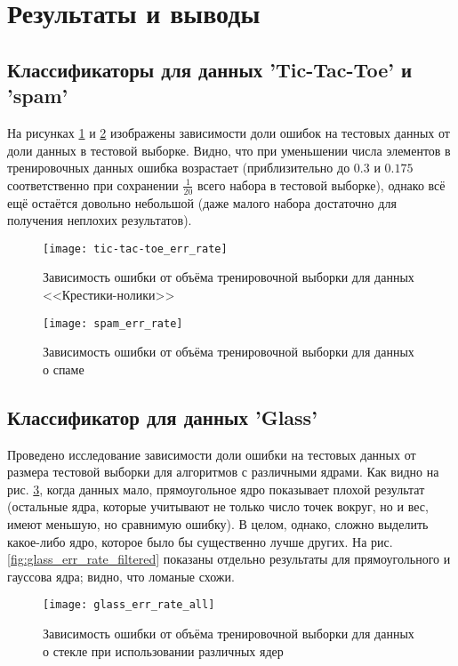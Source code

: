 \documentclass[a4paper,12pt]{article} %
\newcommand{\myPictWidth}{.95\textwidth}
\begin{document}
\newpage
\section{Результаты и выводы}

\subsection{Классификаторы для данных 'Tic-Tac-Toe' и 'spam'}

На рисунках \ref{fig:ttoe} и \ref{fig:spam} изображены зависимости доли ошибок на тестовых данных от доли данных в тестовой выборке. Видно, что при уменьшении числа элементов в тренировочных данных ошибка возрастает (приблизительно до $0.3$ и $0.175$ соответственно при сохранении $\frac{1}{20}$ всего набора в тестовой выборке), однако всё ещё остаётся довольно небольшой (даже малого набора достаточно для получения неплохих результатов).

\begin{figure}[H]
    \centering \texttt{[image: tic-tac-toe\_err\_rate]}
    \caption{Зависимость ошибки от объёма тренировочной выборки для данных <<Крестики-нолики>>}
    \label{fig:ttoe}
\end{figure}

\begin{figure}[H]
    \centering \texttt{[image: spam\_err\_rate]}
    \caption{Зависимость ошибки от объёма тренировочной выборки для данных о спаме}
    \label{fig:spam}
\end{figure}

\newpage

\subsection{Классификатор для данных 'Glass'}

Проведено исследование зависимости доли ошибки на тестовых данных от размера тестовой выборки для алгоритмов с различными ядрами. Как видно на рис. \ref{fig:glass_err_rate_all}, когда данных мало, прямоугольное ядро показывает плохой результат (остальные ядра, которые учитывают не только число точек вокруг, но и вес, имеют меньшую, но сравнимую ошибку). В целом, однако, сложно выделить какое-либо ядро, которое было бы существенно лучше других. На рис. \ref{fig:glass_err_rate_filtered} показаны отдельно результаты для прямоугольного и гауссова ядра; видно, что ломаные схожи.

\begin{figure}[h!]
    \centering \texttt{[image: glass\_err\_rate\_all]}
    \caption{Зависимость ошибки от объёма тренировочной выборки для данных о стекле при использовании различных ядер}
    \label{fig:glass_err_rate_all}
\end{figure}
\end{document}

